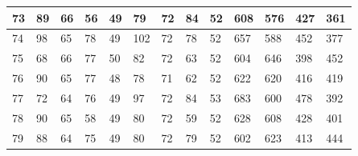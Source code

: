 \documentclass[legalpaper,12pt]{article}
\begin{document}
\begin{table}[h]
\begin{tabular}{|l|l|l|l|l|l|l|l|l|l|l|l|l|}
73                                        & 89         & 66        & 56          & 49         & 79         & 72        & 84          & 52         & 608        & 576       & 427         & 361        \\ \hline
74                                        & 98         & 65        & 78          & 49         & 102        & 72        & 78          & 52         & 657        & 588       & 452         & 377        \\ \hline
75                                        & 68         & 66        & 77          & 50         & 82         & 72        & 63          & 52         & 604        & 646       & 398         & 452        \\ \hline
76                                        & 90         & 65        & 77          & 48         & 78         & 71        & 62          & 52         & 622        & 620       & 416         & 419        \\ \hline
77                                        & 72         & 64        & 76          & 49         & 97         & 72        & 84          & 53         & 683        & 600       & 478         & 392        \\ \hline
78                                        & 90         & 65        & 58          & 49         & 80         & 72        & 59          & 52         & 628        & 608       & 428         & 401        \\ \hline
79                                        & 88         & 64        & 75          & 49         & 80         & 72        & 79          & 52         & 602        & 623       & 413         & 444        
\end{tabular}
\end{table}
\end{document}
